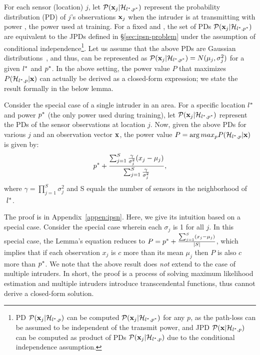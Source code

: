 For each sensor (location) $j$, let $\mathcal{P}(\mathbf{x}_j | \mathcal{H}_{l^*,p^*})$ represent the
probability distribution (PD) of $j$'s observations $\mathbf{x}_j$ when the
intruder is at \lstar transmitting with power \pstar, the power used
at training.
For a fixed \lstar and \pstar, the set of PDs $\mathcal{P}(\mathbf{x}_j | \mathcal{H}_{l^*,p^*})$ are
equivalent to the JPDs defined in \S\ref{sec:ipsn-problem} under the
assumption of conditional independence\footnote{PD $\mathcal{P}(\mathbf{x}_j |
  \mathcal{H}_{l^*,p})$ can be computed $\mathcal{P}(\mathbf{x}_j | \mathcal{H}_{l^*,p^*})$ for any $p$, as the
  path-loss can be assumed to be independent of the transmit power,
  and JPD $\mathcal{P}(\mathbf{x} | \mathcal{H}_{l^*,p})$ can be computed as product of PDs
  $\mathcal{P}(\mathbf{x}_j | \mathcal{H}_{l^*,p})$ due to the conditional independence assumption.}.
Let us assume that the above PDs are Gaussian
distributions~\cite{gauss}, and thus, can be represented as $\mathcal{P}(\mathbf{x}_j
| \mathcal{H}_{l^*,p^*}) = N(\mu_j, \sigma_j^2)$ for a given $l^*$ and $p^*$.
In the above setting, the power value $P$ that maximizes $P(\mathcal{H}_{l^*,p} | \mathbf{x})$
can actually be derived as a closed-form expression; we state the result
formally in the below lemma. 
\begin{lemma-wo-prf}
  Consider the special case of a single intruder in an area.  For a
  specific location $l^*$ and power $p^*$ (the only power used
  during training), let $\mathcal{P}(\mathbf{x}_j | \mathcal{H}_{l^*,p^*})$ represent the PDs of the
  sensor observations at location $j$. Now, given the above PDs for
  various $j$ and an observation vector $\mathbf{x}$, the power value
  $P = \arg max_p P(\mathcal{H}_{l^*,p} | \mathbf{x})$ is   given by: 
  $$p^* + \frac{\sum_{j=1}^{S} \frac{\gamma}{\sigma_j^2}(x_j - \mu_j)}{\sum_{j=1}^{S} \frac{\gamma}{\sigma_j^2}},$$
  where $\gamma = \prod_{j=1}^{S} \sigma_j^2$ and S equals the number of sensors in the neighborhood of  $\ l^*$.
  \label{lem:p}
\end{lemma-wo-prf}
The proof is in Appendix~\ref{appen:ipsn}. 
Here, we give its intuition based on a special case. 
Consider the special case wherein each $\sigma_j$ is 1 for all
$j$. In this special case, the Lemma's equation reduces to $P = p^*
+ \frac{\sum_{j=1}^{S}(x_j - \mu_j)}{|S|}$, which implies that if each
observation $x_j$ is $c$ more than its mean $\mu_j$ then $P$ is also
$c$ more than $p^*$. We note that the above result does {\em not}
extend to the case of multiple intruders. In short, the proof is a process of solving maximum likelihood estimation and multiple intruders introduce transcendental functions, thus cannot derive a closed-form solution.

